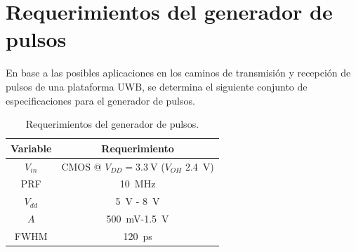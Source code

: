 \section{Requerimientos del generador de pulsos}

En base a las posibles aplicaciones en los caminos de transmisión y recepción de
pulsos de una plataforma UWB, se determina el siguiente conjunto de
especificaciones para el generador de pulsos.

\begin{table}
\centering
\begin{tabular}{c|c}
\hline
    Variable & Requerimiento \\
\hline
    $V_{in}$                &   CMOS @ $V_{DD}=\qty{3.3}{\volt}$ ($V_{OH}$
    \qty{2.4}{\volt})     \\
    PRF                &        \qty{10}{\mega\hertz} \\
    $V_{dd}$                &   \qty{5}{\volt} - \qty{8}{\volt} \\
    $A$                &        \qty{500}{\milli\volt}-\qty{1.5}{\volt} \\
    FWHM                &       \qty{120}{\pico\second} \\
\hline
\end{tabular}
\caption{Requerimientos del generador de pulsos.}
\label{tab:pulser_requirements}
\end{table}
